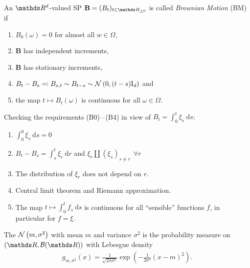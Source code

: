 \begin{defi}
An $\Rd$-valued SP $\B=(B_t)_{t \in \R_{\geq 0}}$
is called \emph{Brownian Motion} (BM) if
\begin{enumerate}[label=(B\arabic*)]
\item $B_0(\omega)=0$ for almost all $w\in \Omega$,
\item $\textbf{B}$ has independent increments,
\item $\textbf{B}$ has stationary increments,
\item $B_t-B_s\eqqcolon B_{s,t}\sim B_{t-s}\sim \mathcal{N}\left(0,(t-s)\mathrm{I}_d\right)$ and
\item the map $t\mapsto B_t(\omega)$ is continuous for all $\omega \in \Omega$.
\end{enumerate}
\end{defi}

\begin{bem}
Checking the requirements (B0)\,--\,(B4)
in view of $B_t=\int_0^t \xi_s~\mathrm{d}s$:
\begin{enumerate}[label=(B\arabic*)]
\item $\int_0^0\xi_s~\mathrm{d}s=0$
\item $B_t-B_s=\int_s^t \xi_r~\mathrm{d}r$
	and $\xi_r \amalg (\xi_s)_{s\not =r}~~\forall r$
\item The distribution of $\xi_r$ does not depend on $r$.
\item Central limit theorem and Riemann approximation.
\item The map $t \mapsto \int_0^t f_s~\mathrm{d}s$ is continuous
	for all “sensible” functions $f$,
	in particular for $f = \xi$.
\end{enumerate}
\end{bem}

\begin{defi}
The  $\mathcal{N}\left(m,\sigma^2\right)$
with mean $m$ and variance $\sigma^2$ is
the probability measure on $(\R,\mathcal{B}(\R))$ with Lebesgue density
\begin{align*}
	g_{m, \sigma^2}(x) = \frac{1}{\sqrt{2\pi \sigma^2}} \exp\left(-\frac{1}{2\sigma^2}(x-m)^2\right).
\end{align*}
\end{defi}


